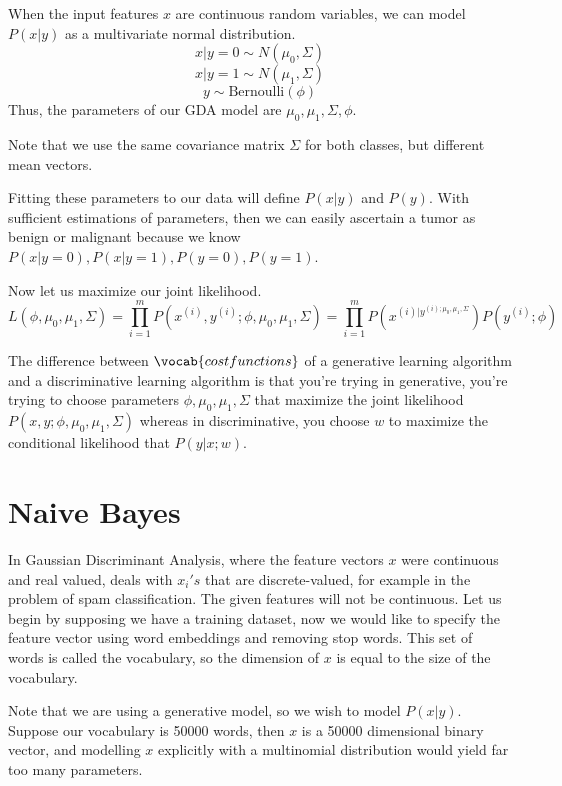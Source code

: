\documentclass[12pt]{scrartcl}
\begin{document}
When the input features $x$ are continuous random variables, we can model $P(x | y)$ as a multivariate normal distribution.
\[x | y = 0 \sim N(\mu_0, \Sigma)\]
\[x | y = 1 \sim N(\mu_1, \Sigma)\]
\[y \sim \text{Bernoulli}(\phi)\]
Thus, the parameters of our GDA model are $\mu_0, \mu_1, \Sigma, \phi$. 

\begin{note}
    Note that we use the same covariance matrix $\Sigma$ for both classes, but different mean vectors.
\end{note}

Fitting these parameters to our data will define $P(x | y)$ and $P(y)$. With sufficient estimations of parameters, then we can easily ascertain a tumor as benign or malignant because we know $P(x | y = 0), P(x | y = 1), P(y = 0), P(y = 1)$.

Now let us maximize our joint likelihood.
\[L(\phi, \mu_0, \mu_1, \Sigma) = \prod_{i=1}^m P(x^{(i)}, y^{(i)}; \phi, \mu_0, \mu_1, \Sigma) = \prod_{i=1}^mP(x^{(i) | y^{(i); \mu_0, \mu_1, \Sigma}})P(y^{(i)}; \phi)\]

\begin{note}
    The difference between $\vocab{cost functions}$ of a generative learning algorithm and a discriminative learning algorithm is that you're trying in generative, you're trying to choose parameters $\phi, \mu_0, \mu_1, \Sigma$ that maximize the joint likelihood $P(x, y; \phi, \mu_0, \mu_1, \Sigma)$ whereas in discriminative, you choose $w$ to maximize the conditional likelihood that $P(y | x; w)$. 
\end{note}

\section{Naive Bayes}

In Gaussian Discriminant Analysis, where the feature vectors $x$ were continuous and real valued,  deals with $x_i's$ that are discrete-valued, for example in the problem of spam classification. The given features will not be continuous. Let us begin by supposing we have a training dataset, now we would like to specify the feature vector using word embeddings and removing stop words. This set of words is called the vocabulary, so the dimension of $x$ is equal to the size of the vocabulary.

\begin{note}
    Note that we are using a generative model, so we wish to model $P(x | y)$. Suppose our vocabulary is 50000 words, then $x$ is a 50000 dimensional binary vector, and modelling $x$ explicitly with a multinomial distribution would yield far too many parameters.
\end{note}
\end{document}
